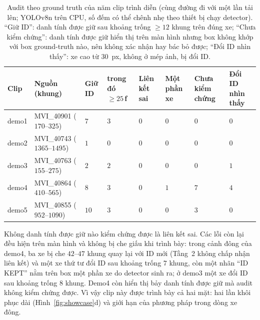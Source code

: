 \begin{table}[H]
    \centering
    \caption{Audit theo ground truth của năm clip trình diễn (cùng đường đi với một lần tải lên; YOLOv8n trên CPU, số đếm có thể chênh nhẹ theo thiết bị chạy detector). ``Giữ ID'': danh tính được giữ sau khoảng trống $\ge 12$ khung trên đúng xe; ``Chưa kiểm chứng'': danh tính được giữ hiển thị trên màn hình nhưng box không khớp với box ground-truth nào, nên không xác nhận hay bác bỏ được; ``Đổi ID nhìn thấy'': xe cao từ $30$~px, không ở mép ảnh, bị đổi ID.}
    \label{tab:demo3}
    \small
    \begin{tabularx}{\textwidth}{l l C C C C C C}
        \toprule
        \textbf{Clip} & \textbf{Nguồn (khung)} & \textbf{Giữ ID} & \textbf{trong đó $\ge 25$\,f} & \textbf{Liên kết sai} & \textbf{Một phần xe} & \textbf{Chưa kiểm chứng} & \textbf{Đổi ID nhìn thấy} \\
        \midrule
        demo1 & MVI\_40901 ($170$--$325$) & $7$ & $3$ & $0$ & $0$ & $0$ & $0$ \\
        demo2 & MVI\_40743 ($1365$--$1495$) & $1$ & $0$ & $0$ & $0$ & $0$ & $0$ \\
        demo3 & MVI\_40763 ($155$--$275$) & $2$ & $2$ & $0$ & $0$ & $0$ & $1$ \\
        demo4 & MVI\_40864 ($410$--$565$) & $8$ & $3$ & $0$ & $1$ & $7$ & $4$ \\
        demo5 & MVI\_40855 ($952$--$1090$) & $10$ & $3$ & $0$ & $0$ & $3$ & $0$ \\
        \bottomrule
    \end{tabularx}
\end{table}

Không danh tính được giữ nào kiểm chứng được là liên kết sai. Các lỗi còn lại đều hiện trên màn hình và không bị che giấu khi trình bày: trong cảnh đông của demo4, ba xe bị che $42$--$47$ khung quay lại với ID mới (Tầng~2 không chấp nhận liên kết) và một xe thứ tư đổi ID sau khoảng trống $7$ khung, còn một nhãn ``ID KEPT'' nằm trên box một phần xe do detector sinh ra; ở demo3 một xe đổi ID sau khoảng trống $8$ khung. Demo4 còn hiển thị bảy danh tính được giữ mà audit không kiểm chứng được. Vì vậy clip này được trình bày cả hai mặt: hai lần khôi phục dài (Hình~\ref{fig:showcase}d) và giới hạn của phương pháp trong dòng xe đông.


